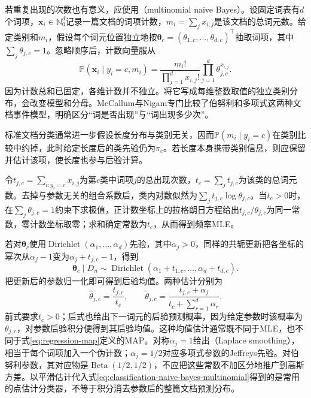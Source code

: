 若重复出现的次数也有意义，应使用（multinomial naive Bayes）。设固定词表有$d$个词项，$\bm{x}_i\in\mathbb{N}_0^d$记录一篇文档的词项计数，$m_i=\sum_jx_{i,j}$是该文档的总词元数。给定类别和$m_i$，假设每个词元位置独立地按$\bm{\theta}_c=(\theta_{1,c},\ldots,\theta_{d,c})^{\top}$抽取词项，其中$\sum_j\theta_{j,c}=1$。忽略顺序后，计数向量服从
\begin{equation}
  \label{eq:classification-naive-bayes-multinomial}
  \mathbb{P}(\bm{x}_i\mid y_i=c,m_i)
  =\frac{m_i!}{\prod_{j=1}^{d}x_{i,j}!}
    \prod_{j=1}^{d}\theta_{j,c}^{x_{i,j}}.
\end{equation}
因为计数总和已固定，各维计数并不独立。将它写成每维整数取值的独立类别分布，会改变模型和分母。McCallum与Nigam专门比较了伯努利和多项式这两种文档事件模型，明确区分“词是否出现”与“词出现多少次”。

标准文档分类通常进一步假设长度分布与类别无关，因而$\mathbb{P}(m_i\mid y_i=c)$在类别比较中约掉，此时给定长度后的类先验仍为$\pi_c$。若长度本身携带类别信息，则应保留并估计该项，使长度也参与后验计算。

令$t_{j,c}=\sum_{i:y_i=c}x_{i,j}$为第$c$类中词项$j$的总出现次数，$t_c=\sum_jt_{j,c}$为该类的总词元数。去掉与参数无关的组合系数后，类内对数似然为$\sum_jt_{j,c}\log\theta_{j,c}$。当$t_c>0$时，在$\sum_j\theta_{j,c}=1$约束下求极值，正计数坐标上的拉格朗日方程给出$t_{j,c}/\theta_{j,c}$为同一常数，零计数坐标取零；求和确定常数为$t_c$，从而得到频率MLE。

若对$\bm{\theta}_c$使用$\operatorname{Dirichlet}(\alpha_1,\ldots,\alpha_d)$先验，其中$\alpha_j>0$，同样的共轭更新把各坐标的幂次从$\alpha_j-1$变为$\alpha_j+t_{j,c}-1$，得到
\[
  \bm{\theta}_c\mid D_n
  \sim\operatorname{Dirichlet}
    (\alpha_1+t_{1,c},\ldots,\alpha_d+t_{d,c}).
\]
把更新后的参数归一化即可得到后验均值。两种估计分别为
\begin{equation}
  \label{eq:classification-naive-bayes-smoothing}
  \hat\theta_{j,c}=\frac{t_{j,c}}{t_c},
  \qquad
  \tilde\theta_{j,c}
  =\frac{t_{j,c}+\alpha_j}
         {t_c+\sum_{r=1}^{d}\alpha_r}.
\end{equation}
前式要求$t_c>0$；后式也给出下一词元的后验预测概率，因为给定参数时该概率为$\theta_{j,c}$，对参数后验积分便得到其后验均值。这种均值估计通常既不同于MLE，也不同于式\eqref{eq:regression-map}定义的MAP。对称$\alpha_j=1$给出（Laplace smoothing），相当于每个词项加入一个伪计数；$\alpha_j=1/2$对应多项式参数的Jeffreys先验。对伯努利参数，其对应物是$\operatorname{Beta}(1/2,1/2)$，不应把这些常数不加区分地推广到高斯方差。以平滑估计代入式\eqref{eq:classification-naive-bayes-multinomial}得到的是常用的点估计分类器，不等于积分消去参数后的整篇文档预测分布。

